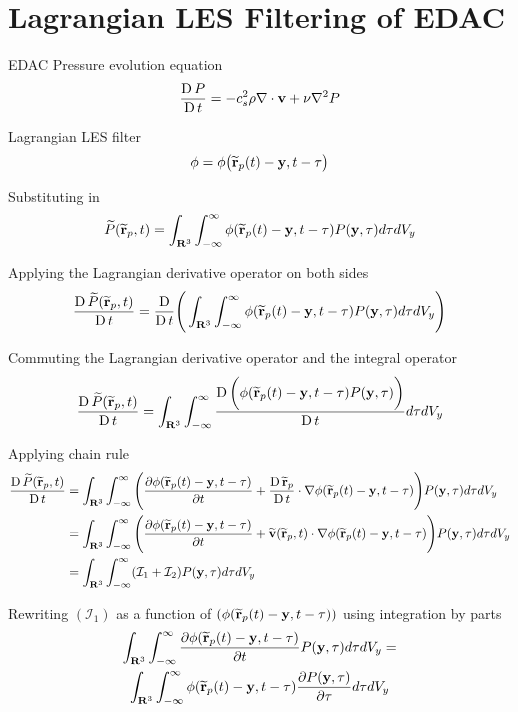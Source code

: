 
\chapter{Lagrangian LES Filtering of EDAC} %

\label{appendix:lagrangian-les-filtering-of-edac} %
EDAC Pressure evolution equation
\begin{equation}
    \LagDerivative{P} = -c_s^2 \rho \nabla \cdot \vect{v} + \nu \nabla^2 P
    \label{eq:P-evolution}
\end{equation}

Lagrangian LES filter \parencite{DiMascio2017}
\begin{equation}
    \phi = \phi\big(\TildeR_p(t)-\vect{y}, t-\tau  \big)
    \label{eq:lag-les-filter}
\end{equation}

Substituting  in 
\begin{equation}
     \widetilde{P}(\widetilde{\mathbf{r}}_p, t) = \int_{\mathbf{R}^3} \int_{-\infty}^{\infty} \phi (\widetilde{\mathbf{r}}_p(t)-\mathbf{y}, t-\tau) P(\mathbf{y}, \tau) d \tau d V_y
\end{equation}

Applying the Lagrangian derivative operator on both sides
\begin{equation}
     \frac{\operatorname{D} \widetilde{P}(\widetilde{\mathbf{r}}_p, t)}{\operatorname{D} t} = \frac{\operatorname{D} }{\operatorname{D} t} \Bigg( \int_{\mathbf{R}^3} \int_{-\infty}^{\infty} \phi (\widetilde{\mathbf{r}}_p(t)-\mathbf{y}, t-\tau) P(\mathbf{y}, \tau) d \tau d V_y \Bigg)
\end{equation}

Commuting the Lagrangian derivative operator and the integral operator
\begin{equation}
    \frac{\operatorname{D} \widetilde{P}(\widetilde{\mathbf{r}}_p, t)}{\operatorname{D} t} = \int_{\mathbf{R}^3} \int_{-\infty}^{\infty} \frac{\operatorname{D} \bigg(\phi (\widetilde{\mathbf{r}}_p(t)-\mathbf{y}, t-\tau) P(\mathbf{y}, \tau)\bigg)}{\operatorname{D} t} d \tau d V_y
\end{equation}

Applying chain rule
\begin{equation}
    \begin{split}
        \LagDerivative{\TilePArgRp} & = \IntRThreeAndT \Bigg( \PartialDerivative{\PhiRY} + \LagDerivative{\TildeR_p} \cdot \nabla \PhiRY \Bigg) \PY \IntD \\
        & = \IntRThreeAndT \Bigg( \PartialDerivative{\PhiRY} + \TildeVArgRp \cdot \nabla \PhiRY \Bigg) \PY \IntD \\
        & = \IntRThreeAndT (\mathcal{I}_1 + \mathcal{I}_2) \PY \IntD
    \end{split}
    \label{eq:integral-phi-complex}
\end{equation}

Rewriting $(\mathcal{I}_1)$ as a function of $(\phi (\widetilde{\mathbf{r}}_p(t)-\mathbf{y}, t-\tau))$ using integration by parts
\begin{multline}
    \IntRThreeAndT \PartialDerivative{\PhiRY} \PY \IntD =\\ \IntRThreeAndT \PhiRY \PartialDerivative[\tau]{\PY} \IntD
    \label{eq:i1-phi}
\end{multline}

